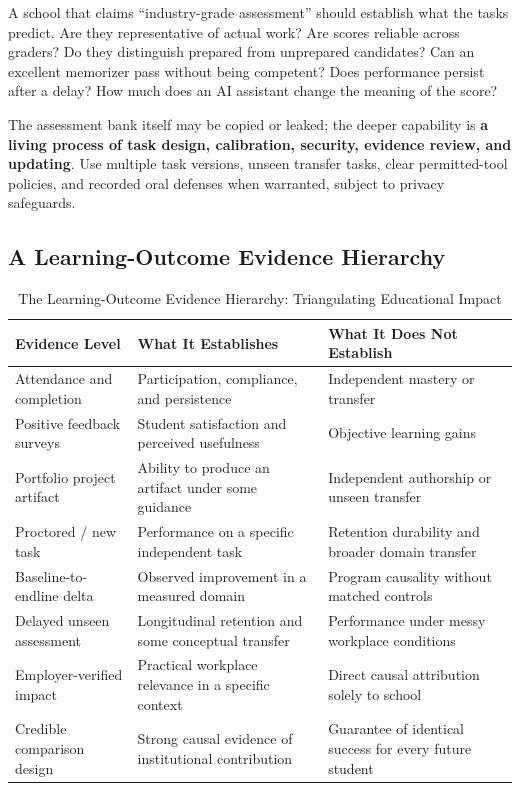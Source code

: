 A school that claims ``industry-grade assessment'' should establish what the tasks predict. Are they representative of actual work? Are scores reliable across graders? Do they distinguish prepared from unprepared candidates? Can an excellent memorizer pass without being competent? Does performance persist after a delay? How much does an AI assistant change the meaning of the score?

The assessment bank itself may be copied or leaked; the deeper capability is \textbf{a living process of task design, calibration, security, evidence review, and updating}. Use multiple task versions, unseen transfer tasks, clear permitted-tool policies, and recorded oral defenses when warranted, subject to privacy safeguards.

\subsection{A Learning-Outcome Evidence Hierarchy}
\label{sec:learning_outcome_evidence_hierarchy}

\begin{table}[t]
\centering
\small
\caption{The Learning-Outcome Evidence Hierarchy: Triangulating Educational Impact}
\label{tab:learning_outcome_hierarchy}
\begin{tabularx}{\textwidth}{p{4cm} X X}
\toprule
\textbf{Evidence Level} & \textbf{What It Establishes} & \textbf{What It Does Not Establish} \\
\midrule
Attendance and completion & Participation, compliance, and persistence & Independent mastery or transfer \\
\addlinespace[2pt]
Positive feedback surveys & Student satisfaction and perceived usefulness & Objective learning gains \\
\addlinespace[2pt]
Portfolio project artifact & Ability to produce an artifact under some guidance & Independent authorship or unseen transfer \\
\addlinespace[2pt]
Proctored / new task & Performance on a specific independent task & Retention durability and broader domain transfer \\
\addlinespace[2pt]
Baseline-to-endline delta & Observed improvement in a measured domain & Program causality without matched controls \\
\addlinespace[2pt]
Delayed unseen assessment & Longitudinal retention and some conceptual transfer & Performance under messy workplace conditions \\
\addlinespace[2pt]
Employer-verified impact & Practical workplace relevance in a specific context & Direct causal attribution solely to school \\
\addlinespace[2pt]
Credible comparison design & Strong causal evidence of institutional contribution & Guarantee of identical success for every future student \\
\bottomrule
\end{tabularx}
\end{table}


